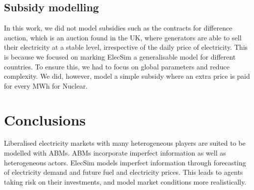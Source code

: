 \subsection*{Subsidy modelling}

In this work, we did not model subsidies such as the contracts for difference auction, which is an auction found in the UK, where generators are able to sell their electricity at a stable level, irrespective of the daily price of electricity. This is because we focused on marking ElecSim a generalisable model for different countries. To ensure this, we had to focus on global parameters and reduce complexity. We did, however, model a simple subsidy where an extra price is paid for every MWh for Nuclear. 



\clearpage
\section{Conclusions}
\label{elecsim:sec:conclusions}


Liberalised electricity markets with many heterogeneous players are suited to be modelled with ABMs. ABMs incorporate imperfect information as well as heterogeneous actors. ElecSim models imperfect information through forecasting of electricity demand and future fuel and electricity prices. This leads to agents taking risk on their investments, and model market conditions more realistically.





